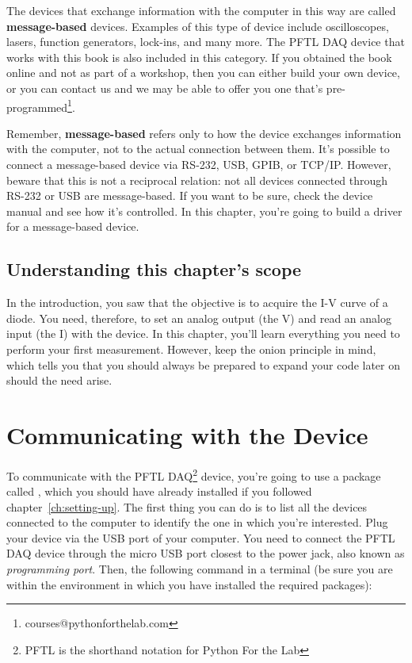 The devices that exchange information with the computer in this way are called \textbf{message-based} devices. Examples of this type of device include oscilloscopes, lasers, function generators, lock-ins, and many more. The {PFTL DAQ} device that works with this book is also included in this category. If you obtained the book online and not as part of a workshop, then you can either build your own device, or you can contact us and we may be able to offer you one that's pre-programmed\footnote{courses@pythonforthelab.com}.


Remember, \textbf{message-based} refers only to how the device exchanges information with the computer, not to the actual connection between them. It's possible to connect a message-based device via RS-232, USB, GPIB, or TCP/IP. However, beware that this is not a reciprocal relation: not all devices connected through RS-232 or USB are message-based. If you want to be sure, check the device manual and see how it's controlled. In this chapter, you're going to build a driver for a message-based device.

\subsection{Understanding this chapter's scope}\label{subsec:scope-of-the-chapter}
In the introduction, you saw that the objective is to acquire the I-V curve of a diode. You need, therefore, to set an analog output (the V) and read an analog input (the I) with the device. In this chapter, you'll learn everything you need to perform your first measurement. However, keep the onion principle in mind, which tells you that you should always be prepared to expand your code later on should the need arise.

\section{Communicating with the Device}\label{sec:message-basedevices}
To communicate with the {PFTL DAQ}\footnote{PFTL is the shorthand notation for Python For the Lab} device, you're going to use a package called , which you should have already installed if you followed chapter~\ref{ch:setting-up}. The first thing you can do is to list all the devices connected to the computer to identify the one in which you're interested. Plug your device via the USB port of your computer. You need to connect the {PFTL DAQ} device through the micro USB port closest to the power jack, also known as \emph{programming port}. Then, the following command in a terminal (be sure you are within the environment in which you have installed the required packages):

